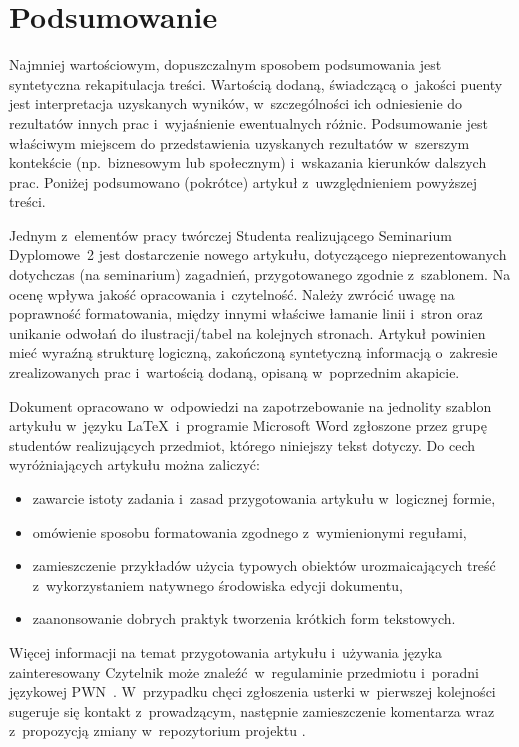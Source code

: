 \section{Podsumowanie}
\label{sec:summary}

Najmniej wartościowym, dopuszczalnym sposobem podsumowania jest syntetyczna rekapitulacja treści. Wartością dodaną, świadczącą o~jakości puenty jest interpretacja uzyskanych wyników, w~szczególności ich odniesienie do rezultatów innych prac i~wyjaśnienie ewentualnych różnic. Podsumowanie jest właściwym miejscem do przedstawienia uzyskanych rezultatów w~szerszym kontekście (np.~biznesowym lub społecznym) i~wskazania kierunków dalszych prac. Poniżej podsumowano (pokrótce) artykuł z~uwzględnieniem powyższej treści.

Jednym z~elementów pracy twórczej Studenta realizującego Seminarium Dyplomowe~2 jest dostarczenie nowego artykułu, dotyczącego nieprezentowanych dotychczas (na seminarium) zagadnień, przygotowanego zgodnie z~szablonem. Na ocenę wpływa jakość opracowania i~czytelność. Należy zwrócić uwagę na poprawność formatowania, między innymi właściwe łamanie linii i~stron oraz unikanie odwołań do ilustracji/tabel na kolejnych stronach. Artykuł powinien mieć wyraźną strukturę logiczną, zakończoną syntetyczną informacją o~zakresie zrealizowanych prac i~wartością dodaną, opisaną w~poprzednim akapicie.

Dokument opracowano w~odpowiedzi na zapotrzebowanie na jednolity szablon artykułu w~języku \LaTeX~i~programie Microsoft Word zgłoszone przez grupę studentów realizujących przedmiot, którego niniejszy tekst dotyczy. Do cech wyróżniających artykułu można zaliczyć:

\begin{itemize}
	\item zawarcie istoty zadania i~zasad przygotowania artykułu w~logicznej formie,
	\item omówienie sposobu formatowania zgodnego z~wymienionymi regułami,
	\item zamieszczenie przykładów użycia typowych obiektów urozmaicających treść z~wykorzystaniem natywnego środowiska edycji dokumentu,
	\item zaanonsowanie dobrych praktyk tworzenia krótkich form tekstowych.
\end{itemize}

Więcej informacji na temat przygotowania artykułu i~używania języka zainteresowany Czytelnik może znaleźć w~regulaminie przedmiotu i~poradni językowej PWN~\cite{ref:pwn}. W~przypadku chęci zgłoszenia usterki w~pierwszej kolejności sugeruje się kontakt z~prowadzącym, następnie zamieszczenie komentarza wraz z~propozycją zmiany w~repozytorium projektu \cite{ref:github}.
